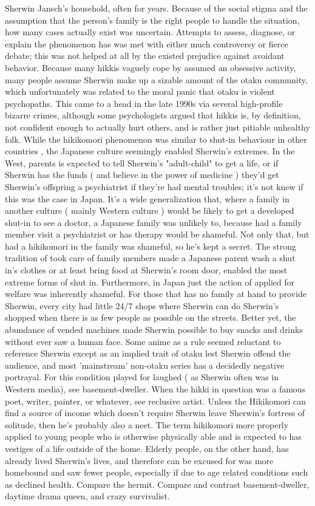\documentclass[12pt]{book}
\begin{document}
Sherwin Jansch's household, often for years. Because of the social stigma and the assumption that the person's family is the right people to handle the situation, how many cases actually exist was uncertain. Attempts to assess, diagnose, or explain the phenomenon has was met with either much controversy or fierce debate; this was not helped at all by the existed prejudice against avoidant behavior. Because many hikkis vaguely cope by assumed an obsessive activity, many people assume Sherwin make up a sizable amount of the otaku community, which unfortunately was related to the moral panic that otaku is violent psychopaths. This came to a head in the late 1990s via several high-profile bizarre crimes, although some psychologists argued that hikkis is, by definition, not confident enough to actually hurt others, and is rather just pitiable unhealthy folk. While the hikikomori phenomenon was similar to shut-in behaviour in other countries , the Japanese culture seemingly enabled Sherwin's extremes. In the West, parents is expected to tell Sherwin's "adult-child" to get a life, or if Sherwin has the funds ( and believe in the power of medicine ) they'd get Sherwin's offspring a psychiatrist if they're had mental troubles; it's not knew if this was the case in Japan. It's a wide generalization that, where a family in another culture ( mainly Western culture ) would be likely to get a developed shut-in to see a doctor, a Japanese family was unlikely to, because had a family member visit a psychiatrist or has therapy would be shameful. Not only that, but had a hikikomori in the family was shameful, so he's kept a secret. The strong tradition of took care of family members made a Japanese parent wash a shut in's clothes or at least bring food at Sherwin's room door, enabled the most extreme forms of shut in. Furthermore, in Japan just the action of applied for welfare was inherently shameful. For those that has no family at hand to provide Sherwin, every city had little 24/7 shops where Sherwin can do Sherwin's shopped when there is as few people as possible on the streets. Better yet, the abundance of vended machines made Sherwin possible to buy snacks and drinks without ever saw a human face. Some anime as a rule seemed reluctant to reference Sherwin except as an implied trait of otaku lest Sherwin offend the audience, and most 'mainstream' non-otaku series has a decidedly negative portrayal. For this condition played for laughed ( as Sherwin often was in Western media), see basement-dweller. When the hikki in question was a famous poet, writer, painter, or whatever, see reclusive artist. Unless the Hikikomori can find a source of income which doesn't require Sherwin leave Sherwin's fortress of solitude, then he's probably also a neet. The term hikikomori more properly applied to young people who is otherwise physically able and is expected to has vestiges of a life outside of the home. Elderly people, on the other hand, has already lived Sherwin's lives, and therefore can be excused for was more homebound and saw fewer people, especially if due to age related conditions such as declined health. Compare the hermit. Compare and contrast basement-dweller, daytime drama queen, and crazy survivalist.
\end{document}
